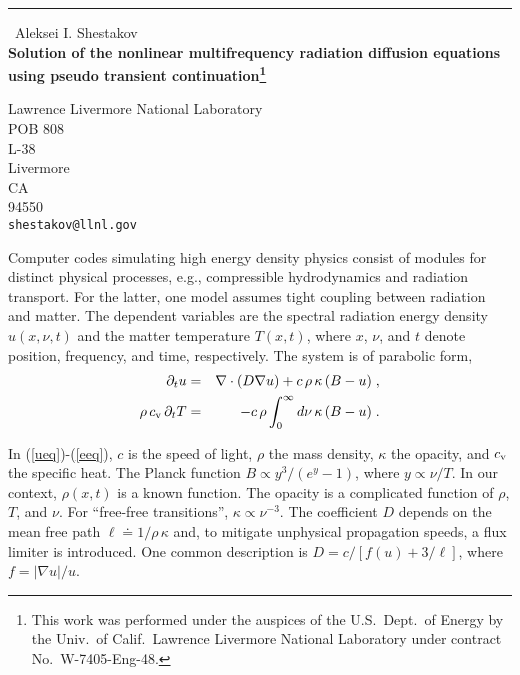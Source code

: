 \documentclass{report}
\begin{document}
\begin{center}
\rule{6in}{1pt} \
{\large Aleksei I. Shestakov \\
{\bf Solution of the nonlinear multifrequency radiation diffusion equations using pseudo transient continuation\thanks{This work was performed under the auspices of the U.S.\ Dept.\ of Energy by the Univ.\ of Calif.\ Lawrence Livermore National Laboratory under contract No.\ W-7405-Eng-48.}}}

Lawrence Livermore National Laboratory \\ POB 808 \\ L-38 \\ Livermore \\ CA \\ 94550
\\
{\tt shestakov@llnl.gov}\end{center}

\newcommand{\be}{\begin{equation}}
\newcommand{\ee}{\end{equation}}
\newcommand{\bey}{\begin{eqnarray}}
\newcommand{\eey}{\end{eqnarray}}

\newcommand{\pref}[1]{(\ref{#1})}

\newcommand{\cv}{c_{\rm v}}
\newcommand{\dt}{\Delta t}
\newcommand{\gdt}{\Delta \tau}


Computer codes simulating high energy density physics
consist of modules for distinct physical processes,
e.g., compressible hydrodynamics and radiation transport.
For the latter, one model assumes tight coupling between radiation
and matter. The dependent variables are the
spectral radiation energy density $u( x, \nu, t)$ and the matter
temperature $T( x, t)$, where $x$, $\nu$, and $t$ denote position,
frequency, and time, respectively.
The system is of parabolic form,
\bey
\partial_t u & = & \nabla \cdot (D \nabla u) +
c \, \rho \, \kappa \, ( B - u ) \; , \label{ueq} \\
\rho \, \cv \, \partial_t T & = & - c \, \rho \int_0^{\infty} d \nu
\, \kappa \, ( B - u ) \; . \label{eeq}
\eey

In \pref{ueq}-\pref{eeq}, $c$ is the speed of light, $\rho$ the
mass density, $\kappa$ the opacity, and $\cv$ the specific heat.
The Planck function
$B \propto y^3 / (e^y - 1)$, where $y \propto \nu / T$.
In our context, $\rho( x, t)$ is a known function. The opacity
is a complicated function of $\rho$, $T$, and $\nu$.
For ``free-free transitions'', $\kappa \propto \nu^{-3}$.
The coefficient $D$ depends on the mean free path
$\ell \doteq 1 / \rho \, \kappa$ and, to mitigate unphysical
propagation speeds, a flux limiter is introduced. One common
description is $D = c / [ f(u) + 3/ \ell]$, where $f= |\nabla u| / u$.
\end{document}
